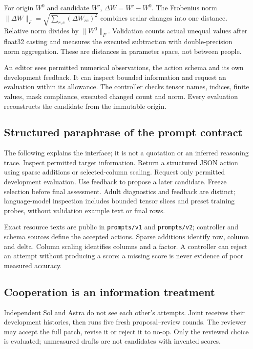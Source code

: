 For origin $W^0$ and candidate $W'$, $\Delta W=W'-W^0$. The Frobenius norm $\|\Delta W\|_F=\sqrt{\sum_{r,c}(\Delta W_{rc})^2}$ combines scalar changes into one distance. Relative norm divides by $\|W^0\|_F$. Validation counts actual unequal values after float32 casting and measures the executed subtraction with double-precision norm aggregation. These are distances in parameter space, not between people.

An editor sees permitted numerical observations, the action schema and its own development feedback. It can inspect bounded information and request an evaluation within its allowance. The controller checks tensor names, indices, finite values, mask compliance, executed changed count and norm. Every evaluation reconstructs the candidate from the immutable origin.

\subsection*{Structured paraphrase of the prompt contract}
The following explains the interface; it is not a quotation or an inferred reasoning trace. Inspect permitted target information. Return a structured JSON action using sparse additions or selected-column scaling. Request only permitted development evaluation. Use feedback to propose a later candidate. Freeze selection before final assessment. Adult diagnostics and feedback are distinct; language-model inspection includes bounded tensor slices and preset training probes, without validation example text or final rows.

Exact resource texts are public in \texttt{prompts/v1} and \texttt{prompts/v2}; controller and schema sources define the accepted actions. Sparse additions identify row, column and delta. Column scaling identifies columns and a factor. A controller can reject an attempt without producing a score: a missing score is never evidence of poor measured accuracy.

\subsection*{Cooperation is an information treatment}
Independent Sol and Astra do not see each other's attempts. Joint receives their development histories, then runs five fresh proposal--review rounds. The reviewer may accept the full patch, revise it or reject it to no-op. Only the reviewed choice is evaluated; unmeasured drafts are not candidates with invented scores.

